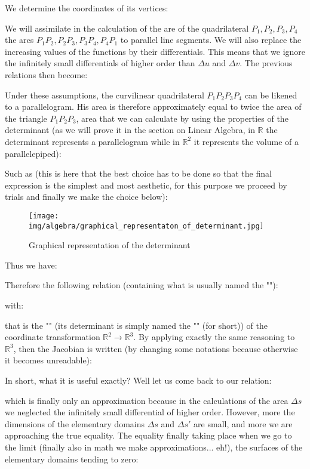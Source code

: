 	We determine the coordinates of its vertices:
	
	
	We will assimilate in the calculation of the are of the quadrilateral  $P_1,P_2,P_3,P_4$ the arcs $P_1P_2,P_2P_3,P_3P_4,P_4P_1$ to parallel line segments. We will also replace the increasing values of the functions by their differentials. This means that we ignore the infinitely small differentials of higher order than $\Delta u$ and $\Delta v$. The previous relations then become:
	

	Under these assumptions, the curvilinear quadrilateral $P_1P_2P_3P_4$ can be likened to a parallelogram. His area is therefore approximately equal to twice the area of the triangle $P_1P_2P_3$, area that we can calculate by using the properties of the determinant (as we will prove it in the section on Linear Algebra, in $\mathbb{R}$ the determinant  represents a parallelogram while in $\mathbb{R}^2$ it represents the volume of a parallelepiped):
	
	Such as (this is here that the best choice has to be done so that the final expression is the simplest and most aesthetic, for this purpose we proceed by trials and finally we make the choice below):
	\begin{figure}[H]
		\centering
		\texttt{[image: img/algebra/graphical\_representaton\_of\_determinant.jpg]}
		\caption{Graphical representation of the determinant}
	\end{figure}

	Thus we have:
	
	Therefore the following relation (containing what is usually named the ""):
	
	with:
	
	that is the "" (its determinant is simply named the "" (for short)) of the coordinate transformation $\mathbb{R}^2 \rightarrow \mathbb{R}^3$. By applying exactly the same reasoning to $\mathbb{R}^3$, then the Jacobian is written (by changing some notations because otherwise it becomes unreadable):
	
	In short, what it is useful exactly? Well let us come back to our relation:
	
	which is finally only an approximation because in the calculations of the area $\Delta s$ we neglected the infinitely small differential of higher order. However, more the dimensions of the elementary domains $\Delta s$ and $\Delta s'$ are small, and more we are approaching the true equality. The equality finally taking place when we go to the limit (finally also in math we make approximations... eh!), the surfaces of the elementary domains tending to zero:
	
